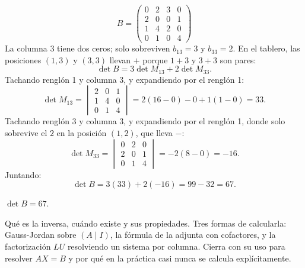 \documentclass[11pt,letterpaper]{article}
\begin{document}
\begin{ejemplo}[Ejercicio 67]
    \[
        B = \begin{pmatrix}
            0 & 2 & 3 & 0 \\
            2 & 0 & 0 & 1 \\
            1 & 4 & 2 & 0 \\
            0 & 1 & 0 & 4
        \end{pmatrix}
    \]
    La columna 3 tiene dos ceros; solo sobreviven $b_{13} = 3$ y
    $b_{33} = 2$. En el tablero, las posiciones $(1,3)$ y $(3,3)$
    llevan $+$ porque $1 + 3$ y $3 + 3$ son pares:
    \[
        \det B = 3 \det M_{13} + 2 \det M_{33} .
    \]
    Tachando renglón 1 y columna 3, y expandiendo por el renglón 1:
    \[
        \det M_{13} =
        \begin{vmatrix} 2 & 0 & 1 \\ 1 & 4 & 0 \\ 0 & 1 & 4
        \end{vmatrix}
        = 2(16 - 0) - 0 + 1(1 - 0) = 33 .
    \]
    Tachando renglón 3 y columna 3, y expandiendo por el renglón 1,
    donde solo sobrevive el $2$ en la posición $(1,2)$, que lleva
    $-$:
    \[
        \det M_{33} =
        \begin{vmatrix} 0 & 2 & 0 \\ 2 & 0 & 1 \\ 0 & 1 & 4
        \end{vmatrix}
        = -2(8 - 0) = -16 .
    \]
    Juntando:
    \[
        \det B = 3(33) + 2(-16) = 99 - 32 = 67 .
    \]
\end{ejemplo}

\begin{resultado}
    $\det B = 67$.
\end{resultado}

\newpage



\begin{quick_sum}
    Qué es la inversa, cuándo existe y sus propiedades. Tres formas de
    calcularla: Gauss-Jordan sobre $(A \mid I)$, la fórmula de la
    adjunta con cofactores, y la factorización $LU$ resolviendo un
    sistema por columna. Cierra con su uso para resolver $AX = B$ y
    por qué en la práctica casi nunca se calcula explícitamente.
\end{quick_sum}
\end{document}
